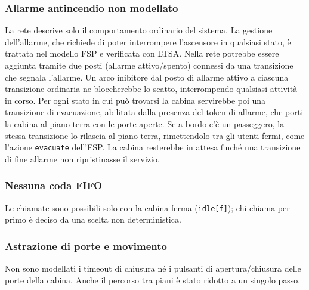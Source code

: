\subsubsection{Allarme antincendio non modellato}
La rete descrive solo il comportamento ordinario del sistema.
La gestione dell'allarme, che richiede di poter interrompere l'ascensore in qualsiasi stato, è trattata nel modello FSP e verificata con LTSA.
Nella rete potrebbe essere aggiunta tramite due posti (allarme attivo/spento) connessi da una transizione che segnala l'allarme.
Un arco inibitore dal posto di allarme attivo a ciascuna transizione ordinaria ne bloccherebbe lo scatto, interrompendo qualsiasi attività in corso.
Per ogni stato in cui può trovarsi la cabina servirebbe poi una transizione di evacuazione, abilitata dalla presenza del token di allarme, che porti la cabina al piano terra con le porte aperte.
Se a bordo c'è un passeggero, la stessa transizione lo rilascia al piano terra, rimettendolo tra gli utenti fermi, come l'azione \texttt{evacuate} dell'FSP.
La cabina resterebbe in attesa finché una transizione di fine allarme non ripristinasse il servizio.

\subsubsection{Nessuna coda FIFO}
Le chiamate sono possibili solo con la cabina ferma (\texttt{idle[f]}); chi chiama per primo è deciso da una scelta non deterministica.

\subsubsection{Astrazione di porte e movimento}
Non sono modellati i timeout di chiusura né i pulsanti di apertura/chiusura delle porte della cabina.
Anche il percorso tra piani è stato ridotto a un singolo passo.
